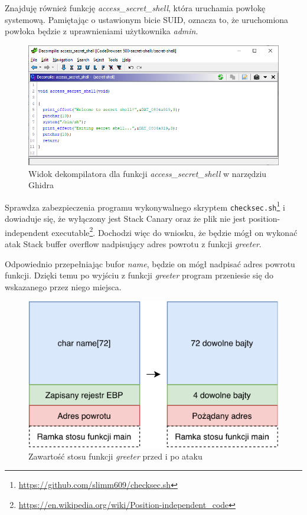 \documentclass[language=polish,type=eng]{aghmodern}
\begin{document}
\begin{appendices}
Znajduję również funkcję \emph{access\_secret\_shell}, która uruchamia powłokę systemową.
Pamiętając o ustawionym bicie SUID, oznacza to, że uruchomiona powłoka będzie z uprawnieniami
użytkownika \emph{admin}.

\begin{figure}[H]
\centering
\includegraphics[width=\textwidth]{500_access}
\caption{Widok dekompilatora dla funkcji \emph{access\_secret\_shell} w narzędziu Ghidra}
\end{figure}

Sprawdza zabezpieczenia programu wykonywalnego skryptem \texttt{checksec.sh}\footnote{
\url{https://github.com/slimm609/checksec.sh}} i dowiaduje się, że wyłączony jest Stack Canary
oraz że plik nie jest position-independent executable\footnote{
\url{https://en.wikipedia.org/wiki/Position-independent_code}}.
Dochodzi więc do wniosku, że będzie mógł on wykonać atak Stack buffer overflow
nadpisujący adres powrotu z funkcji \emph{greeter}.

Odpowiednio przepełniając bufor \emph{name}, będzie on mógł nadpisać adres powrotu
funkcji. Dzięki temu po wyjściu z funkcji \emph{greeter} program przeniesie się do
wskazanego przez niego miejsca.

\begin{figure}[H]
\centering
\includegraphics[width=\textwidth]{500_stack}
\caption{Zawartość stosu funkcji \emph{greeter} przed i po ataku}
\end{figure}


\end{appendices}
\end{document}
